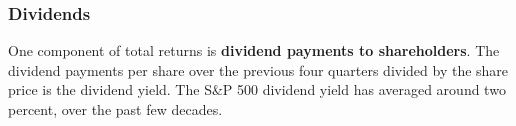 \subsubsection*{Dividends}
\begin{minipage}{0.76\textwidth} 
\small One component of total returns is \textbf{dividend payments to shareholders}. The dividend payments per share over the previous four quarters divided by the share price is the dividend yield. The S\&P 500 dividend yield has averaged around two percent, over the past few decades.


\vspace{1mm}

\vspace{2.7cm}

\hspace{5mm} 

\end{minipage}
\vspace{1mm}

